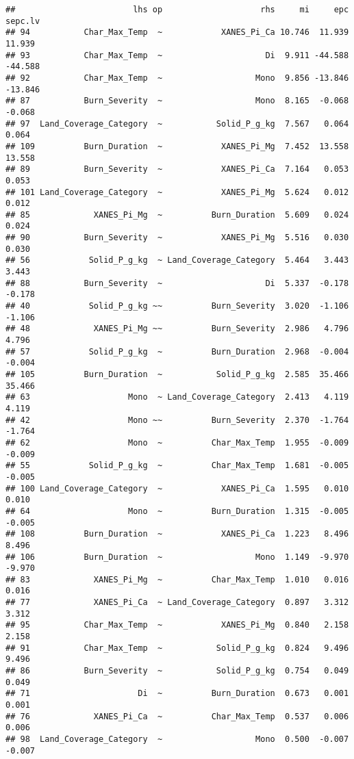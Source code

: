 \documentclass[
]{article}
\begin{document}
\begin{verbatim}
##                        lhs op                    rhs     mi     epc sepc.lv
## 94           Char_Max_Temp  ~            XANES_Pi_Ca 10.746  11.939  11.939
## 93           Char_Max_Temp  ~                     Di  9.911 -44.588 -44.588
## 92           Char_Max_Temp  ~                   Mono  9.856 -13.846 -13.846
## 87           Burn_Severity  ~                   Mono  8.165  -0.068  -0.068
## 97  Land_Coverage_Category  ~           Solid_P_g_kg  7.567   0.064   0.064
## 109          Burn_Duration  ~            XANES_Pi_Mg  7.452  13.558  13.558
## 89           Burn_Severity  ~            XANES_Pi_Ca  7.164   0.053   0.053
## 101 Land_Coverage_Category  ~            XANES_Pi_Mg  5.624   0.012   0.012
## 85             XANES_Pi_Mg  ~          Burn_Duration  5.609   0.024   0.024
## 90           Burn_Severity  ~            XANES_Pi_Mg  5.516   0.030   0.030
## 56            Solid_P_g_kg  ~ Land_Coverage_Category  5.464   3.443   3.443
## 88           Burn_Severity  ~                     Di  5.337  -0.178  -0.178
## 40            Solid_P_g_kg ~~          Burn_Severity  3.020  -1.106  -1.106
## 48             XANES_Pi_Mg ~~          Burn_Severity  2.986   4.796   4.796
## 57            Solid_P_g_kg  ~          Burn_Duration  2.968  -0.004  -0.004
## 105          Burn_Duration  ~           Solid_P_g_kg  2.585  35.466  35.466
## 63                    Mono  ~ Land_Coverage_Category  2.413   4.119   4.119
## 42                    Mono ~~          Burn_Severity  2.370  -1.764  -1.764
## 62                    Mono  ~          Char_Max_Temp  1.955  -0.009  -0.009
## 55            Solid_P_g_kg  ~          Char_Max_Temp  1.681  -0.005  -0.005
## 100 Land_Coverage_Category  ~            XANES_Pi_Ca  1.595   0.010   0.010
## 64                    Mono  ~          Burn_Duration  1.315  -0.005  -0.005
## 108          Burn_Duration  ~            XANES_Pi_Ca  1.223   8.496   8.496
## 106          Burn_Duration  ~                   Mono  1.149  -9.970  -9.970
## 83             XANES_Pi_Mg  ~          Char_Max_Temp  1.010   0.016   0.016
## 77             XANES_Pi_Ca  ~ Land_Coverage_Category  0.897   3.312   3.312
## 95           Char_Max_Temp  ~            XANES_Pi_Mg  0.840   2.158   2.158
## 91           Char_Max_Temp  ~           Solid_P_g_kg  0.824   9.496   9.496
## 86           Burn_Severity  ~           Solid_P_g_kg  0.754   0.049   0.049
## 71                      Di  ~          Burn_Duration  0.673   0.001   0.001
## 76             XANES_Pi_Ca  ~          Char_Max_Temp  0.537   0.006   0.006
## 98  Land_Coverage_Category  ~                   Mono  0.500  -0.007  -0.007

\end{verbatim}
\end{document}
